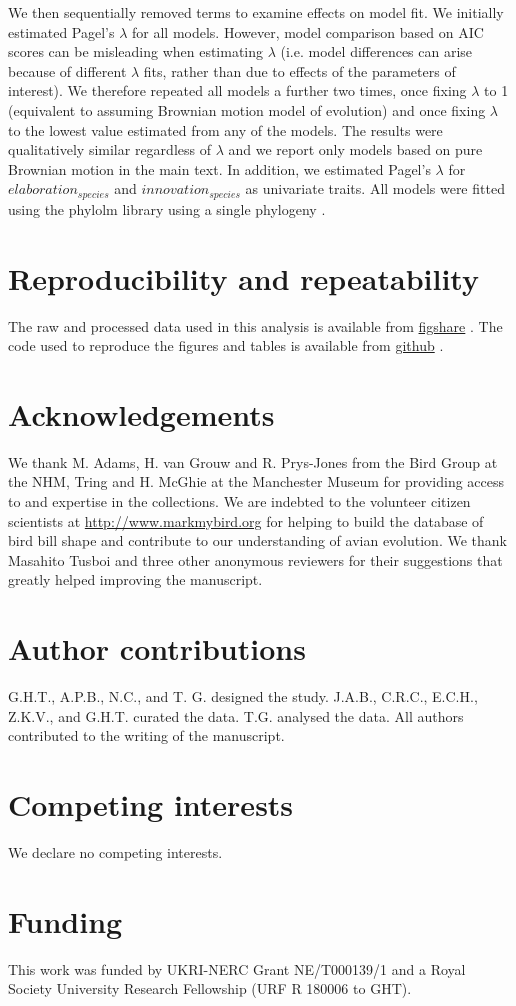 \documentclass[12pt,letterpaper]{article}
\begin{document}
We then sequentially removed terms to examine effects on model fit.
We initially estimated Pagel's $\lambda$ \cite{pagel1997inferring} for all models.
However, model comparison based on AIC scores can be misleading when estimating $\lambda$ (i.e. model differences can arise because of different $\lambda$ fits, rather than due to effects of the parameters of interest).
We therefore repeated all models a further two times, once fixing $\lambda$ to 1 (equivalent to assuming Brownian motion model of evolution) and once fixing $\lambda$ to the lowest value estimated from any of the models.
The results were qualitatively similar regardless of $\lambda$ and we report only models based on pure Brownian motion in the main text.
In addition, we estimated Pagel’s $\lambda$ for $elaboration_{species}$ and $innovation_{species}$ as univariate traits.
All models were fitted using the phylolm library using a single phylogeny \cite{phylom}.


\section*{Reproducibility and repeatability}
The raw and processed data used in this analysis is available from \href{https://figshare.com/articles/dataset/Innovation_and_elaboration_on_the_avian_tree_of_life/20480355}{figshare} \cite{fighsaredata}.
The code used to reproduce the figures and tables is available from \href{https://github.com/TGuillerme/elaboration_exploration_bird_beaks}{github} \cite{githubrepo}.

\section*{Acknowledgements}
We thank M. Adams, H. van Grouw and R. Prys-Jones from the Bird Group at the NHM, Tring and H. McGhie at the Manchester Museum for providing access to and expertise in the collections.
We are indebted to the volunteer citizen scientists at \url{http://www.markmybird.org} for helping to build the database of bird bill shape and contribute to our understanding of avian evolution. 
We thank Masahito Tusboi and three other anonymous reviewers for their suggestions that greatly helped improving the manuscript.

\section*{Author contributions} G.H.T., A.P.B., N.C., and T. G. designed the study. J.A.B., C.R.C., E.C.H., Z.K.V., and G.H.T. curated the data. T.G. analysed the data. All authors contributed to the writing of the manuscript.

\section*{Competing interests} We declare no competing interests.

\section*{Funding}
This work was funded by UKRI-NERC Grant NE/T000139/1 and a Royal Society University Research Fellowship (URF R 180006 to GHT).




\end{document}

